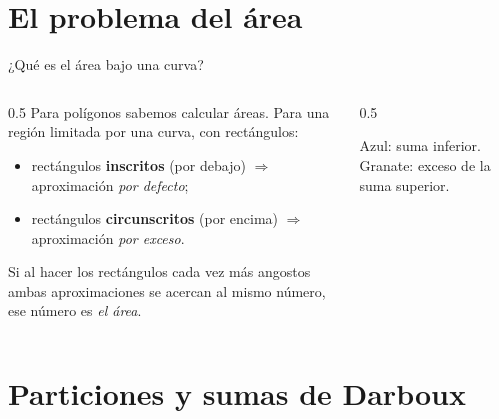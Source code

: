 \documentclass[10pt,aspectratio=169]{beamer}
\begin{document}
\section{El problema del área}

\begin{frame}{¿Qué es el área bajo una curva?}
  \begin{columns}
    \begin{column}{0.5\textwidth}
      Para polígonos sabemos calcular áreas. Para una región limitada por una curva,
       con rectángulos:
      \begin{itemize}
        \item rectángulos \textbf{inscritos} (por debajo) $\Rightarrow$ aproximación \emph{por defecto};
        \item rectángulos \textbf{circunscritos} (por encima) $\Rightarrow$ aproximación \emph{por exceso}.
      \end{itemize}
      \begin{idea}
        Si al hacer los rectángulos cada vez más angostos ambas aproximaciones se acercan al mismo
        número, ese número es \emph{el área}.
      \end{idea}
    \end{column}
    \begin{column}{0.5\textwidth}
      \centering

      \small Azul: suma inferior. Granate: exceso de la suma superior.
    \end{column}
  \end{columns}
\end{frame}

\section{Particiones y sumas de Darboux}
\end{document}
